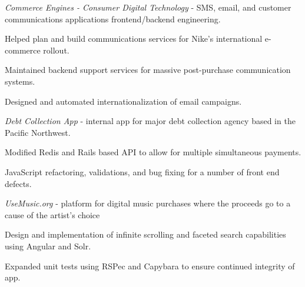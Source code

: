 \documentclass[]{deedy-resume-openfont}
\begin{document}
\begin{minipage}[t]{0.66\textwidth}
\textit{Commerce Engines - Consumer Digital Technology} - SMS, email, and customer communications applications frontend/backend engineering.
\begin{tightemize}
\item Helped plan and build communications services for Nike's international e-commerce rollout.
\item Maintained backend support services for massive post-purchase communication systems.
\item Designed and automated internationalization of email campaigns.
\end{tightemize}
\sectionsep

\textit{Debt Collection App} - internal app for major debt collection agency based in the Pacific Northwest.
\begin{tightemize}
\item Modified Redis and Rails based API to allow for multiple simultaneous payments.
\item JavaScript refactoring, validations, and bug fixing for a number of front end defects.
\end{tightemize}
\textit{UseMusic.org} - platform for digital music purchases where the proceeds go to a cause of the artist’s choice
\begin{tightemize}
\item Design and implementation of infinite scrolling and faceted search capabilities using Angular and Solr.
\item Expanded unit tests using RSPec and Capybara to ensure continued integrity of app.
\end{tightemize}
\sectionsep

\end{minipage} 
\end{document}
